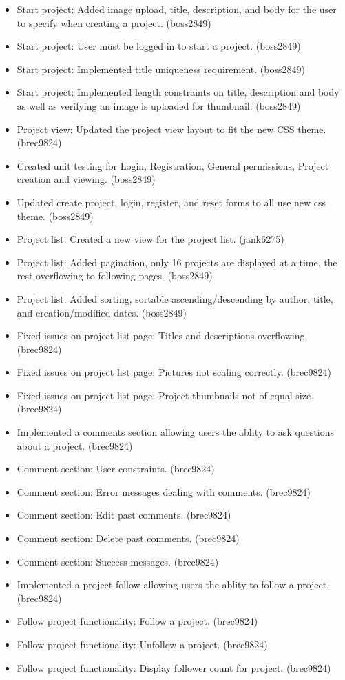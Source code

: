\documentclass[11pt]{report}
\begin{document}
    \begin{itemize}
        \item Start project: Added image upload, title, description, and body for the user to specify when creating a project. (boss2849)
        \item Start project: User must be logged in to start a project. (boss2849)
        \item Start project: Implemented title uniqueness requirement. (boss2849)
        \item Start project: Implemented length constraints on title, description and body as well as verifying an image is uploaded for thumbnail. (boss2849)
        \item Project view: Updated the project view layout to fit the new CSS theme. (brec9824)
        \item Created unit testing for Login, Registration, General permissions, Project creation and viewing. (boss2849)
        \item Updated create project, login, register, and reset forms to all use new css theme. (boss2849)
        \item Project list: Created a new view for the project list. (jank6275)
        \item Project list: Added pagination, only 16 projects are displayed at a time, the rest overflowing to following pages. (boss2849)
        \item Project list: Added sorting, sortable ascending/descending by author, title, and creation/modified dates. (boss2849)
        \item Fixed issues on project list page: Titles and descriptions overflowing. (brec9824)
        \item Fixed issues on project list page: Pictures not scaling correctly. (brec9824)
        \item Fixed issues on project list page: Project thumbnails not of equal size. (brec9824)
        \item Implemented a comments section allowing users the ablity to ask questions about a project. (brec9824)
        \item Comment section: User constraints. (brec9824)
        \item Comment section: Error messages dealing with comments. (brec9824)
        \item Comment section: Edit past comments. (brec9824)
        \item Comment section: Delete past comments. (brec9824)
        \item Comment section: Success messages. (brec9824)
        \item Implemented a project follow allowing users the ablity to follow a project. (brec9824)
        \item Follow project functionality: Follow a project. (brec9824)
        \item Follow project functionality: Unfollow a project. (brec9824)
        \item Follow project functionality: Display follower count for project. (brec9824)
    \end{itemize}
\end{document}
